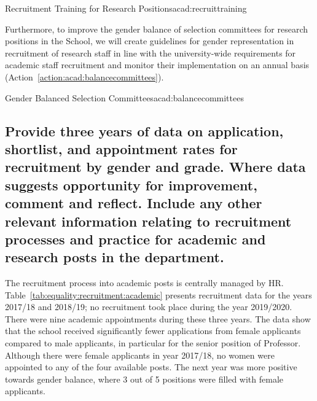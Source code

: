 


\begin{actionblock}{\ksspace{}Recruitment Training for Research Positions}{acad:recruittraining}
\actrecruitmenttraining
\hfill{
    \hypersetup{hidelinks}
    \hyperlink{c7}{\gotoactionsymbol{}}
}
\end{actionblock}

Furthermore, to improve the gender balance of selection committees for research positions in the School, we will create guidelines for gender representation in recruitment of research staff in line with the university-wide requirements for academic staff recruitment and monitor their implementation on an annual basis (Action~\ref{action:acad:balancecommittees}).


\begin{actionblock}{\ksspace{}Gender Balanced Selection Committees}{acad:balancecommittees}
\actbalancedselection
\hfill{
    \hypersetup{hidelinks}
    \hyperlink{c5}{\gotoactionsymbol{}}
}
\end{actionblock}


\subsection{Provide three years of data on application, shortlist, and appointment rates for recruitment by gender and grade. Where data suggests opportunity for improvement, comment and reflect. Include any other relevant information relating to recruitment processes and practice for academic and research posts in the department. }

The recruitment process into academic posts is centrally managed by \ac{HR}. Table~\ref{tab:equality:recruitment:academic} presents recruitment data for the years 2017/18 and 2018/19; no recruitment took place during the year 2019/2020. 
There were nine academic appointments during these three years.
The data show that the school received significantly fewer applications from female applicants compared to male applicants, in particular for the senior position of Professor. 
Although there were female applicants in year 2017/18, no women were appointed to any of the four available posts. 
The next year was more positive towards gender balance, where 3 out of 5 positions were filled with female applicants. 

